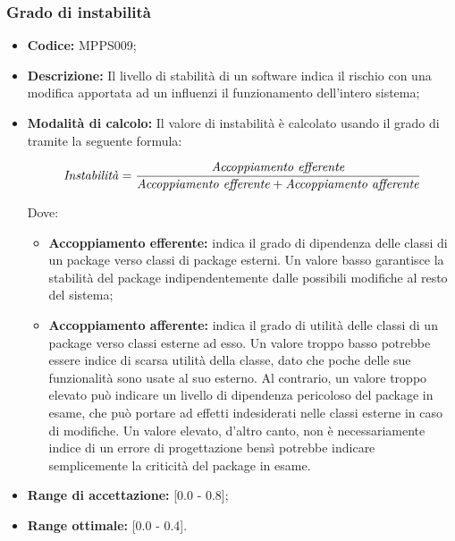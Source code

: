 \documentclass[../NormediProgetto.tex]{subfiles}
\begin{document}
\subsubsection{Grado di instabilità}

\begin{itemize}
	\item \textbf{Codice:} MPPS009;
	
	\item \textbf{Descrizione:} Il livello di stabilità di un software indica il rischio con una modifica apportata ad un  influenzi il funzionamento dell'intero sistema;
	
	\item \textbf{Modalità di calcolo:} Il valore di instabilità è calcolato usando il grado di  tramite la seguente formula:
	
	\[ \textrm{\textit{Instabilità}} = \frac{\textrm{\textit{Accoppiamento efferente}}}{\textrm{\textit{Accoppiamento efferente}} + \textrm{\textit{Accoppiamento afferente}}} \]
	
	Dove:
	
	\begin{itemize}
		\item \textbf{Accoppiamento efferente:} indica il grado di dipendenza delle classi di un package verso classi di package esterni. Un valore basso garantisce la stabilità del package indipendentemente dalle possibili modifiche al resto del sistema;
		
		\item \textbf{Accoppiamento afferente:} indica il grado di utilità delle classi di un package verso classi esterne ad esso. Un valore troppo basso potrebbe essere indice di scarsa utilità della classe, dato che poche delle sue funzionalità sono usate al suo esterno. Al contrario, un valore troppo elevato può indicare un livello di dipendenza pericoloso del package in esame, che può portare ad effetti indesiderati nelle classi esterne in caso di modifiche. Un valore elevato, d'altro canto, non è necessariamente indice di un errore di progettazione bensì potrebbe indicare semplicemente la criticità del package in esame.
	\end{itemize}
	
	\item \textbf{Range di accettazione:} [0.0 - 0.8];
	\item \textbf{Range ottimale:} [0.0 - 0.4].
	
\end{itemize}
\end{document}
